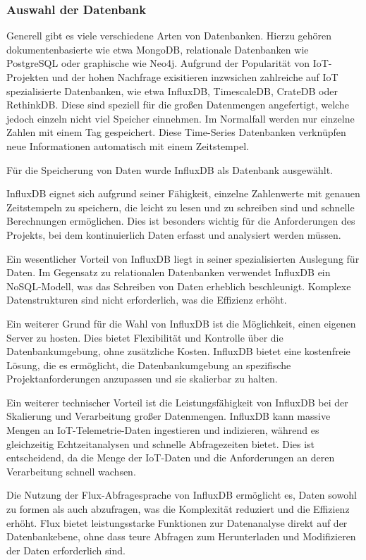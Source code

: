 \subsubsection{Auswahl der Datenbank}

Generell gibt es viele verschiedene Arten von Datenbanken. Hierzu gehören dokumentenbasierte wie etwa MongoDB, relationale Datenbanken wie PostgreSQL oder graphische wie Neo4j. Aufgrund der Popularität von IoT-Projekten und der hohen Nachfrage exisitieren inzwsichen zahlreiche auf IoT spezialisierte Datenbanken, wie etwa InfluxDB, TimescaleDB, CrateDB oder RethinkDB. Diese sind speziell für die großen Datenmengen angefertigt, welche jedoch einzeln nicht viel Speicher einnehmen. Im Normalfall werden nur einzelne Zahlen mit einem Tag gespeichert. Diese Time-Series Datenbanken verknüpfen neue Informationen automatisch mit einem Zeitstempel.

Für die Speicherung von Daten wurde InfluxDB als Datenbank ausgewählt. \cite{influxdata2021iot} 

InfluxDB eignet sich aufgrund seiner Fähigkeit, einzelne Zahlenwerte mit genauen Zeitstempeln zu speichern, die leicht zu lesen und zu schreiben sind und schnelle Berechnungen ermöglichen. Dies ist besonders wichtig für die Anforderungen des Projekts, bei dem kontinuierlich Daten erfasst und analysiert werden müssen.

Ein wesentlicher Vorteil von InfluxDB liegt in seiner spezialisierten Auslegung für Daten. Im Gegensatz zu relationalen Datenbanken verwendet InfluxDB ein NoSQL-Modell, was das Schreiben von Daten erheblich beschleunigt. Komplexe Datenstrukturen sind nicht erforderlich, was die Effizienz erhöht. 

Ein weiterer Grund für die Wahl von InfluxDB ist die Möglichkeit, einen eigenen Server zu hosten. Dies bietet Flexibilität und Kontrolle über die Datenbankumgebung, ohne zusätzliche Kosten. InfluxDB bietet eine kostenfreie Lösung, die es ermöglicht, die Datenbankumgebung an spezifische Projektanforderungen anzupassen und sie skalierbar zu halten.

Ein weiterer technischer Vorteil ist die Leistungsfähigkeit von InfluxDB bei der Skalierung und Verarbeitung großer Datenmengen. InfluxDB kann massive Mengen an IoT-Telemetrie-Daten ingestieren und indizieren, während es gleichzeitig Echtzeitanalysen und schnelle Abfragezeiten bietet. Dies ist entscheidend, da die Menge der IoT-Daten und die Anforderungen an deren Verarbeitung schnell wachsen.

Die Nutzung der Flux-Abfragesprache von InfluxDB ermöglicht es, Daten sowohl zu formen als auch abzufragen, was die Komplexität reduziert und die Effizienz erhöht. Flux bietet leistungsstarke Funktionen zur Datenanalyse direkt auf der Datenbankebene, ohne dass teure Abfragen zum Herunterladen und Modifizieren der Daten erforderlich sind.

